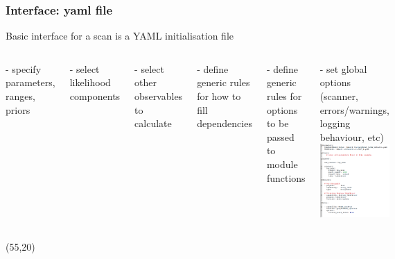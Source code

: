 \documentclass[xcolor=dvipsnames]{beamer}
\begin{document}
\begin{frame}
\frametitle{Interface: yaml file}

Basic interface for a scan is a YAML initialisation file
\begin{columns}
\bi
\item[-] \alert<2>{specify parameters, ranges, priors}
\item[-] \alert<3>{select likelihood components}
\item[-] \alert<3>{select other observables to calculate}
\item[-] \alert<4>{define generic rules for how to fill dependencies}
\item[-] \alert<4>{define generic rules for options to be passed to module functions}
\item[-] \alert<5>{set global options (scanner, errors/warnings, logging behaviour, etc)}
\ei
{}
\includegraphics[width=1.2\textwidth]{yamlshot}
\end{columns}

\begin{textblock}{20}(55,20)
  {
  }
\end{textblock}


\end{frame}
\end{document}
